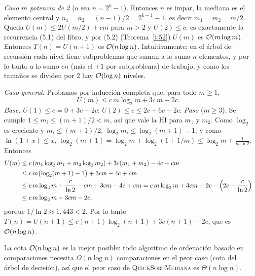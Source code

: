 \emph{Caso $m$ potencia de 2} (o sea $n=2^k-1$). Entonces $n$ es impar, la mediana es el
elemento central y $n_1=n_2=(n-1)/2=2^{k-1}-1$, es decir $m_1=m_2=m/2$. Queda
$U(m)\le 2U(m/2)+cm$ para $m>2$ y $U(2)\le c$: es exactamente la recurrencia (5.1) del
libro, y por (5.2) (Teorema~\ref{t:52}) $U(m)$ es $\mathcal{O}(m\log m)$. Entonces $T(n)=U(n+1)$
es $\mathcal{O}(n\log n)$. Intuitivamente: en el árbol de recursión cada nivel tiene subproblemas
que suman a lo sumo $n$ elementos, y por lo tanto a lo sumo $cn$ (más el $+1$ por
subproblema) de trabajo, y como los tamaños se dividen por $2$ hay $\mathcal{O}(\log n)$ niveles.

\emph{Caso general.} Probamos por inducción completa que, para todo $m\ge1$,
\[
U(m)\le c\,m\log_2 m+3c\,m-2c .
\]
\textit{Base.} $U(1)\le c=0+3c-2c$; $U(2)\le c\le 2c+6c-2c$.
\textit{Paso} ($m\ge3$). Se cumple $1\le m_i\le (m+1)/2<m$, así que vale la HI para $m_1$
y $m_2$. Como $\log_2$ es creciente y $m_i\le(m+1)/2$,
$\log_2 m_i\le\log_2(m+1)-1$; y como $\ln(1+x)\le x$,
$\log_2(m+1)=\log_2 m+\log_2(1+1/m)\le\log_2 m+\frac{1}{m\ln 2}$. Entonces
\begin{align*}
U(m)&\le c\,(m_1\log_2 m_1+m_2\log_2 m_2)+3c(m_1+m_2)-4c+cm\\
&\le c\,m\bigl(\log_2(m+1)-1\bigr)+3cm-4c+cm\\
&\le c\,m\log_2 m+\frac{c}{\ln2}-cm+3cm-4c+cm
= c\,m\log_2 m+3cm-2c-\Bigl(2c-\frac{c}{\ln 2}\Bigr)\\
&\le c\,m\log_2 m+3cm-2c,
\end{align*}
porque $1/\ln 2\approx1{,}443<2$. Por lo tanto
$T(n)=U(n+1)\le c(n+1)\log_2(n+1)+3c(n+1)-2c$, que es $\mathcal{O}(n\log n)$.

\begin{observacion}
La cota $\mathcal{O}(n\log n)$ es la mejor posible: todo algoritmo de ordenación basado en
comparaciones necesita $\Omega(n\log n)$ comparaciones en el peor caso (cota del árbol de
decisión), así que el peor caso de \textsc{QuickSortMediana} es $\Theta(n\log n)$.
\end{observacion}


